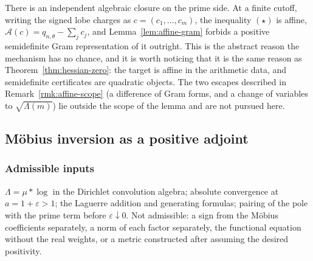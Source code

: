 \documentclass[11pt]{amsart}
\theoremstyle{definition}
\theoremstyle{remark}
\theoremstyle{definition}
\newcommand{\eps}{\varepsilon}
\begin{document}
There is an independent algebraic closure on the prime side. At a finite cutoff, writing the
signed lobe charges as $c=(c_1,\dots,c_m)$, the inequality $(\star)$ is affine,
$\mathcal A(c)=q_{n,\theta}-\sum_jc_j$, and Lemma~\ref{lem:affine-gram} forbids a positive
semidefinite Gram representation of it outright. This is the abstract reason the mechanism has no
chance, and it is worth noticing that it is the same reason as Theorem~\ref{thm:hessian-zero}:
the target is affine in the arithmetic data, and semidefinite certificates are quadratic objects.
The two escapes described in Remark~\ref{rmk:affine-scope} (a difference of Gram forms, and a
change of variables to $\sqrt{\Lambda(m)}$) lie outside the scope of the lemma and are not
pursued here.

\subsection{M\"obius inversion as a positive adjoint}\label{sec:m5-gram}

\subsubsection*{Admissible inputs}
$\Lambda=\mu*\log$ in the Dirichlet convolution algebra; absolute convergence at
$a=1+\eps>1$; the Laguerre addition and generating formulas; pairing of the pole with the prime
term before $\eps\downarrow0$. Not admissible: a sign from the M\"obius coefficients separately,
a norm of each factor separately, the functional equation without the real weights, or a metric
constructed after assuming the desired positivity.
\end{document}
